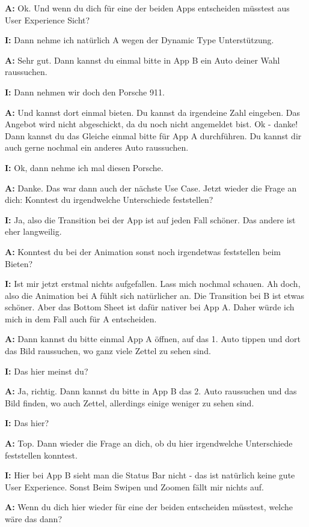 \begin{myparindent}{0pt}
\textbf{A:} Ok. Und wenn du dich für eine der beiden Apps entscheiden müsstest aus User Experience Sicht?

\textbf{I:} Dann nehme ich natürlich A wegen der Dynamic Type Unterstützung. 

\textbf{A:} Sehr gut. Dann kannst du einmal bitte in App B ein Auto deiner Wahl raussuchen. 

\textbf{I:} Dann nehmen wir doch den Porsche 911.

\textbf{A:} Und kannst dort einmal bieten. Du kannst da irgendeine Zahl eingeben. Das Angebot wird nicht abgeschickt, da du noch nicht angemeldet bist. Ok - danke! 
Dann kannst du das Gleiche einmal bitte für App A durchführen. Du kannst dir auch gerne nochmal ein anderes Auto raussuchen. 

\textbf{I:} Ok, dann nehme ich mal diesen Porsche. 

\textbf{A:} Danke. Das war dann auch der nächste Use Case. Jetzt wieder die Frage an dich: Konntest du irgendwelche Unterschiede feststellen?

\textbf{I:} Ja, also die Transition bei der App ist auf jeden Fall schöner. Das andere ist eher langweilig.

\textbf{A:} Konntest du bei der Animation sonst noch irgendetwas feststellen beim Bieten?

\textbf{I:} Ist mir jetzt erstmal nichts aufgefallen. Lass mich nochmal schauen. Ah doch, also die Animation bei A fühlt sich natürlicher an. Die Transition bei B ist etwas schöner. Aber das Bottom Sheet ist dafür nativer bei App A. Daher würde ich mich in dem Fall auch für A entscheiden. 

\textbf{A:} Dann kannst du bitte einmal App A öffnen, auf das 1. Auto tippen und dort das Bild raussuchen, wo ganz viele Zettel zu sehen sind. 

\textbf{I:} Das hier meinst du?

\textbf{A:} Ja, richtig. Dann kannst du bitte in App B das 2. Auto raussuchen und das Bild finden, wo auch Zettel, allerdings einige weniger zu sehen sind. 

\textbf{I:} Das hier?

\textbf{A:} Top. Dann wieder die Frage an dich, ob du hier irgendwelche Unterschiede feststellen konntest. 

\textbf{I:} Hier bei App B sieht man die Status Bar nicht - das ist natürlich keine gute User Experience. Sonst Beim Swipen und Zoomen fällt mir nichts auf. 

\textbf{A:} Wenn du dich hier wieder für eine der beiden entscheiden müsstest, welche wäre das dann?


\end{myparindent}
